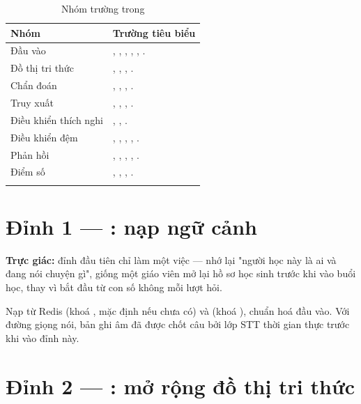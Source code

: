 \begin{longtable}{L{3.2cm} L{10.2cm}}
\toprule
\textbf{Nhóm} & \textbf{Trường tiêu biểu}\\
\midrule
\endhead
Đầu vào & , , , , , .\\
Đồ thị tri thức & , , , .\\
Chẩn đoán & , , , .\\
Truy xuất & , , , .\\
Điều khiển thích nghi & , , .\\
Điều khiển đệm & , , , , .\\
Phản hồi & , , , , .\\
Điểm số & , , , .\\
\bottomrule
\caption{Nhóm trường trong }
\end{longtable}

\section{Đỉnh 1 — : nạp ngữ cảnh}

\textbf{Trực giác:} đỉnh đầu tiên chỉ làm một việc — nhớ lại "người học này là ai và đang
nói chuyện gì", giống một giáo viên mở lại hồ sơ học sinh trước khi vào buổi học, thay vì
bắt đầu từ con số không mỗi lượt hỏi.

Nạp  từ Redis (khoá , mặc định
 nếu chưa có) và 
(khoá ), chuẩn hoá đầu vào. Với đường giọng nói, bản ghi âm
đã được chốt câu bởi lớp STT thời gian thực trước khi vào đỉnh này.

\section{Đỉnh 2 — : mở rộng đồ thị tri thức}

